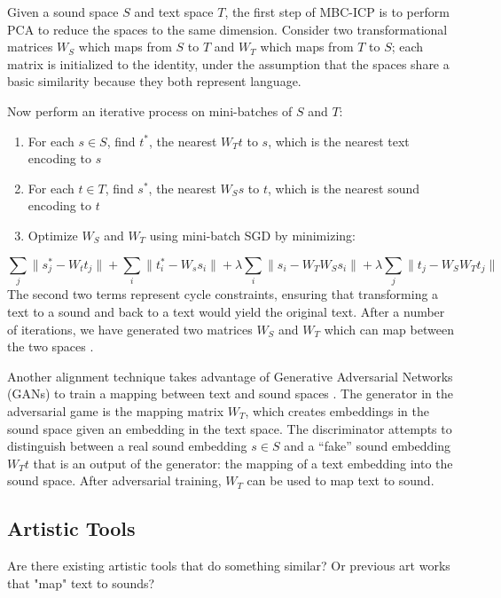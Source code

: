 \documentclass[twoside,a4paper]{article}
\begin{document}
Given a sound space $S$ and text space $T$, the first step of MBC-ICP is to perform PCA to reduce the spaces to the same dimension. Consider two transformational matrices $W_S$ which maps from $S$ to $T$ and $W_T$ which maps from $T$ to $S$; each matrix is initialized to the identity, under the assumption that the spaces share a basic similarity because they both represent language.

Now perform an iterative process on mini-batches of $S$ and $T$:
\begin{enumerate}
    \item For each $s \in S$, find $t^*$, the nearest $W_T t$ to $s$, which is the nearest text encoding to $s$
    \item For each $t \in T$, find $s^*$, the nearest $W_S s$ to $t$, which is the nearest sound encoding to $t$
    \item Optimize $W_S$ and $W_T$ using mini-batch SGD by minimizing:
\end{enumerate}
\begin{equation}
    \sum_{j} \| s^*_j - W_t t_j \| +
    \sum_{i} \| t^*_i - W_s s_i \| +
    \lambda \sum_{i} \| s_i - W_T W_S s_i \| +
    \lambda \sum_{j} \| t_j - W_S W_T t_j \|
\end{equation}\label{eq:icp}
The second two terms represent cycle constraints, ensuring that transforming a text to a sound and back to a text would yield the original text. After a number of iterations, we have generated two matrices $W_S$ and $W_T$ which can map between the two spaces \cite{Chen:18}.

Another alignment technique takes advantage of Generative Adversarial Networks (GANs) to train a mapping between text and sound spaces \cite{Lample:18, Chung:18}. The generator in the adversarial game is the mapping matrix $W_T$, which creates embeddings in the sound space given an embedding in the text space. The discriminator attempts to distinguish between a real sound embedding $s \in S$  and a ``fake'' sound embedding $W_T t$ that is an output of the generator: the mapping of a text embedding into the sound space. After adversarial training, $W_T$ can be used to map text to sound.

\subsection{Artistic Tools}
Are there existing artistic tools that do something similar? Or previous art works that "map" text to sounds? 
\end{document}

